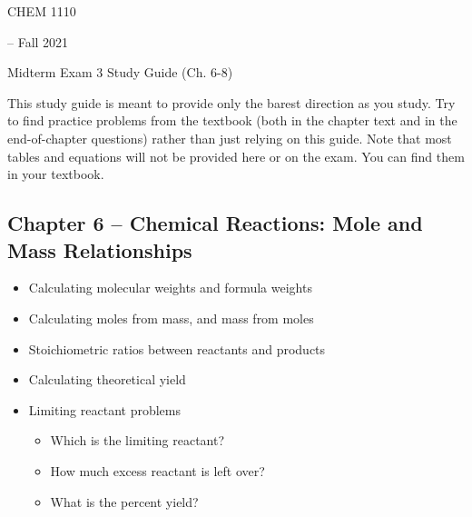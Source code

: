 \documentclass[12pt, letterpaper]{memoir}
\begin{document}
	\mainmatter
	
	\begin{center}
		{\Huge CHEM 1110}
		{\LARGE-- Fall 2021
		
		Midterm Exam 3 Study Guide (Ch. 6-8)}
	\end{center}
	
	This study guide is meant to provide only the barest direction as you study. Try to find practice problems from the textbook (both in the chapter text and in the end-of-chapter questions) rather than just relying on this guide. Note that most tables and equations will not be provided here or on the exam. You can find them in your textbook. 

	\subsection*{Chapter 6 -- Chemical Reactions: Mole and Mass Relationships}
	\begin{itemize}
		\item Calculating molecular weights and formula weights
		\item Calculating moles from mass, and mass from moles
		\item Stoichiometric ratios between reactants and products
		\item Calculating theoretical yield
		\item Limiting reactant problems
		\begin{itemize}
			\item Which is the limiting reactant?
			\item How much excess reactant is left over?
			\item What is the percent yield?
		\end{itemize}
	\end{itemize}
\end{document}
